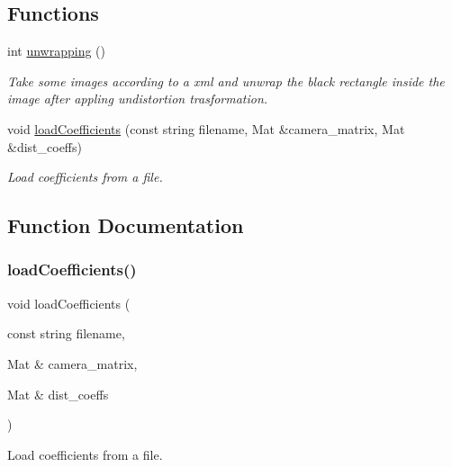 \subsection*{Functions}
\begin{DoxyCompactItemize}
\item 
int \mbox{\hyperlink{unwrapping_8hh_ae232c3264987d57a223a39226929da29}{unwrapping}} ()
\begin{DoxyCompactList}\small\item\em Take some images according to a xml and unwrap the black rectangle inside the image after appling undistortion trasformation. \end{DoxyCompactList}\item 
void \mbox{\hyperlink{unwrapping_8hh_a3cf7df08897ed4d1a7ddcf055b18cca8}{load\+Coefficients}} (const string filename, Mat \&camera\+\_\+matrix, Mat \&dist\+\_\+coeffs)
\begin{DoxyCompactList}\small\item\em Load coefficients from a file. \end{DoxyCompactList}\end{DoxyCompactItemize}


\subsection{Function Documentation}
\mbox{\label{unwrapping_8hh_a3cf7df08897ed4d1a7ddcf055b18cca8}} 
\subsubsection{\texorpdfstring{load\+Coefficients()}{loadCoefficients()}}
{\footnotesize\ttfamily void load\+Coefficients (\begin{DoxyParamCaption}\item[{const string}]{filename,  }\item[{Mat \&}]{camera\+\_\+matrix,  }\item[{Mat \&}]{dist\+\_\+coeffs }\end{DoxyParamCaption})}



Load coefficients from a file. 

